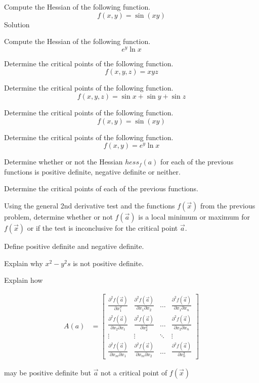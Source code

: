 \documentclass{amsart}
\begin{document}
{{
Compute the Hessian of the following function.
\[f(x,y) = \sin(xy)\]
}
{
Solution
}

{
Compute the Hessian of the following function.
\[e^y\ln x\]
}
{
}

{
Determine the critical points of the following function.
\[f(x,y,z) = xyz\]
}
{
}

{
Determine the critical points of the following function.
\[f(x,y,z) = \sin x + \sin y +\sin z\]
}
{
}

{
Determine the critical points of the following function.
\[f(x,y) = \sin(xy)\]
}
{
}

{
Determine the critical points of the following function.
\[f(x,y) = e^y\ln x\]
}
{
}

{
Determine whether or not the Hessian $hess_f(a)$ for each of the previous functions is positive definite, negative definite or neither.
}
{

}
}

{
Determine the critical points of each of the previous functions.
}
{
}

{
Using the general 2nd derivative test and the functions $f(\vec x)$ from the previous problem, determine whether or not $f(\vec a)$ is a local minimum or maximum for $f(\vec x)$ or if the test is inconclusive for the critical point $\vec a$.
}
{
}

{
Define positive definite and negative definite.
}
{
}

{
Explain why $x^2 - y^2s$ is not positive definite.
}
{
}

{
Explain how 

\begin{align}
	A(a)&=\begin{bmatrix}
				\frac{\partial^2 f(\vec a)}{\partial x_1^2} & \frac{\partial^2 f(\vec a)}{\partial x_1\partial x_2} & \ldots & \frac{\partial^2 f(\vec a)}{\partial x_1 \partial x_n} \\
				\frac{\partial^2 f(\vec a)}{\partial x_2 \partial x_1} & \frac{\partial^2 f(\vec a)}{\partial x_2^2}&  \ldots & \frac{\partial^2 f(\vec a)}{\partial x_2 \partial x_n} \\
				\vdots & \vdots & \ddots & \vdots \\
				\frac{\partial^2 f(\vec a)}{\partial x_m \partial x_1} & \frac{\partial^2 f(\vec a)}{\partial x_m\partial x_2} &\ldots & \frac{\partial^2 f(\vec a)}{\partial x_n^2}			
			\end{bmatrix}
\end{align}

may be positive definite but $\vec a $ not a critical point of $f(\vec x)$
}
{
}
\end{document}
